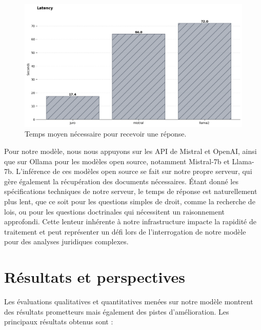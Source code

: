 \begin{figure}[H]
    \centering
    \includegraphics[width=15cm]{gfx/fig-latency-juro.png}
    \caption{Temps moyen nécessaire pour recevoir une réponse.}
    \label{fig:latency-juro}
\end{figure}

Pour notre modèle, nous nous appuyons sur les API de Mistral et OpenAI, ainsi que sur Ollama pour les modèles open source, notamment Mistral-7b et Llama-7b. L'inférence de ces modèles open source se fait sur notre propre serveur, qui gère également la récupération des documents nécessaires. Étant donné les spécifications techniques de notre serveur, le temps de réponse est naturellement plus lent, que ce soit pour les questions simples de droit, comme la recherche de lois, ou pour les questions doctrinales qui nécessitent un raisonnement approfondi. Cette lenteur inhérente à notre infrastructure impacte la rapidité de traitement et peut représenter un défi lors de l'interrogation de notre modèle pour des analyses juridiques complexes.

\newpage
\section{Résultats et perspectives}

Les évaluations qualitatives et quantitatives menées sur notre modèle montrent des résultats prometteurs mais également des pistes d'amélioration. Les principaux résultats obtenus sont :

